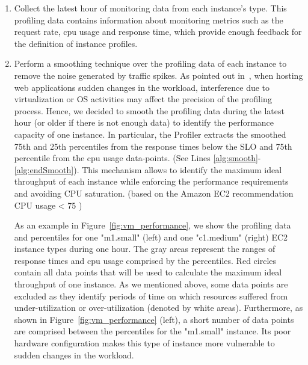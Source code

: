\begin{enumerate}
\item Collect the latest hour of monitoring data from each instance's type. This profiling data contains information about monitoring metrics such as the request rate, cpu usage and response time, which provide enough feedback for the definition of instance profiles. 

\item Perform a smoothing technique over the profiling data of each instance to remove the noise generated by traffic spikes. As pointed out in~\cite{gandhi_hybrid_2012}, when hosting web applications sudden changes in the workload, interference due to virtualization or OS activities may affect the precision of the profiling process. Hence, we decided to smooth the profiling data during the latest hour (or older if there is not enough data) to identify the performance capacity of one instance. In particular, the Profiler extracts the smoothed 75th and 25th percentiles from the response times below the SLO and 75th percentile from the cpu usage data-points. (See Lines \ref{alg:smooth}-\ref{alg:endSmooth}). This mechanism allows to identify the maximum ideal throughput of each instance while enforcing the performance requirements and avoiding CPU saturation. (based on the Amazon EC2 recommendation CPU usage < 75 )

As an example in Figure~\ref{fig:vm_performance}, we show the profiling data and percentiles for one "m1.small" (left) and one "c1.medium" (right) EC2 instance types during one hour. The gray areas represent the ranges of response times and cpu usage comprised by the percentiles. Red circles contain all data points that will be used to calculate the maximum ideal throughput of one instance. As we mentioned above, some data points are excluded as they identify periods of time on which resources suffered from under-utilization or over-utilization (denoted by white areas). Furthermore, as shown in Figure~\ref{fig:vm_performance} (left), a short number of data points are comprised between the percentiles for the "m1.small" instance. Its poor hardware configuration makes this type of instance more vulnerable to sudden changes in the workload.



\end{enumerate}
